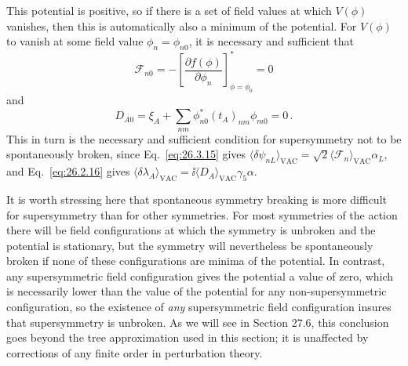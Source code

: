 This potential is positive, so if there is a set of field values at which
\(V(\phi)\) vanishes, then this is automatically also a minimum of the
potential. For \(V(\phi)\) to vanish at some field value
\(\phi_n=\phi_{n0}\), it is necessary and sufficient that
\begin{equation}
  \mathcal{F}_{n0}
  =-\left[
    \frac{\partial f(\phi)}{\partial\phi_n}
  \right]^*_{\phi=\phi_0}
  =0
  \tag{27.4.10}\label{eq:27.4.10}
\end{equation}
and
\begin{equation}
  D_{A0}
  =\xi_A+\sum_{nm}\phi_{n0}^*(t_A)_{nm}\phi_{m0}
  =0\,.
  \tag{27.4.11}\label{eq:27.4.11}
\end{equation}
This in turn is the necessary and sufficient condition for supersymmetry not
to be spontaneously broken, since Eq.~\eqref{eq:26.3.15} gives
\(\langle\delta\psi_{nL}\rangle_{\mathrm{VAC}}
=\sqrt{2}\langle\mathcal{F}_n\rangle_{\mathrm{VAC}}\alpha_L\), and
Eq.~\eqref{eq:26.2.16} gives
\(\langle\delta\lambda_A\rangle_{\mathrm{VAC}}
=\ii\langle D_A\rangle_{\mathrm{VAC}}\gamma_5\alpha\).

It is worth stressing here that spontaneous symmetry breaking is more
difficult for supersymmetry than for other symmetries. For most symmetries of
the action there will be field configurations at which the symmetry is
unbroken and the potential is stationary, but the symmetry will nevertheless
be spontaneously broken if none of these configurations are minima of the
potential. In contrast, any supersymmetric field configuration gives the
potential a value of zero, which is necessarily lower than the value of the
potential for any non-supersymmetric configuration, so the existence of
\textit{any} supersymmetric field configuration insures that supersymmetry is
unbroken. As we will see in Section 27.6, this conclusion goes beyond the tree
approximation used in this section; it is unaffected by corrections of any
finite order in perturbation theory.

